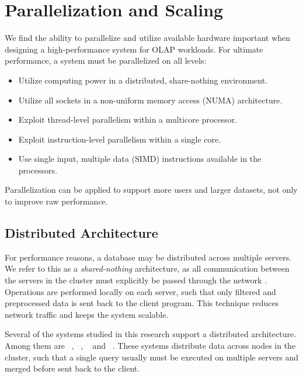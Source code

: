 \chapter{Parallelization and Scaling}
\label{chap:Parallelization and Scaling}
We find the ability to parallelize and utilize available hardware important when designing a high-performance system for OLAP workloads. For ultimate performance, a system must be parallelized on all levels:

\begin{itemize}
  \item Utilize computing power in a distributed, share-nothing environment.
  \item Utilize all sockets in a non-uniform memory access (NUMA) architecture.
  \item Exploit thread-level parallelism within a multicore processor.
  \item Exploit instruction-level parallelism within a single core.
  \item Use single input, multiple data (SIMD) instructions available in the processors.
\end{itemize}

Parallelization can be applied to support more users and larger datasets, not only to improve raw performance.

\newpage

\section{Distributed Architecture}
\label{sec:Distributed Architecture}
For performance reasons, a database may be distributed across multiple servers. We refer to this as a \textit{shared-nothing} architecture, as all communication between the servers in the cluster must explicitly be passed through the network \cite{DeWitt1992-ki}. Operations are performed locally on each server,  such that only filtered and preprocessed data is sent back to the client program. This technique reduces network traffic and keeps the system scalable. 


Several of the systems studied in this research support a distributed architecture. Among them are \oracle~\cite{Mukherjee2015-ul}, \cstore~\cite{Stonebraker2005-qz}, \saph~\cite{Farber2012-vh} and \exasol~\cite{Exasol2014-xh}. These systems distribute data across nodes in the cluster, such that a single query usually must be executed on multiple servers and merged before sent back to the client.

